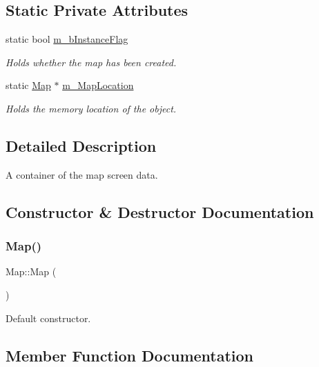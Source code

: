 \subsection*{Static Private Attributes}
\begin{DoxyCompactItemize}
\item 
static bool \hyperlink{class_map_a2f2bb4f55b0eb2faf7db0b7242b46d3c}{m\+\_\+b\+Instance\+Flag}
\begin{DoxyCompactList}\small\item\em Holds whether the map has been created. \end{DoxyCompactList}\item 
static \hyperlink{class_map}{Map} $\ast$ \hyperlink{class_map_a7898e6aaad997b91c5772b4607872c0b}{m\+\_\+\+Map\+Location}
\begin{DoxyCompactList}\small\item\em Holds the memory location of the object. \end{DoxyCompactList}\end{DoxyCompactItemize}


\subsection{Detailed Description}
A container of the map screen data. 

\subsection{Constructor \& Destructor Documentation}
\mbox{\label{class_map_a0f5ad0fd4563497b4214038cbca8b582}} 
\subsubsection{\texorpdfstring{Map()}{Map()}}
{\footnotesize\ttfamily Map\+::\+Map (\begin{DoxyParamCaption}{ }\end{DoxyParamCaption})}



Default constructor. 



\subsection{Member Function Documentation}
\mbox{\label{class_map_ab78fd8c747e184be9b86b993a60ca00b}} 
